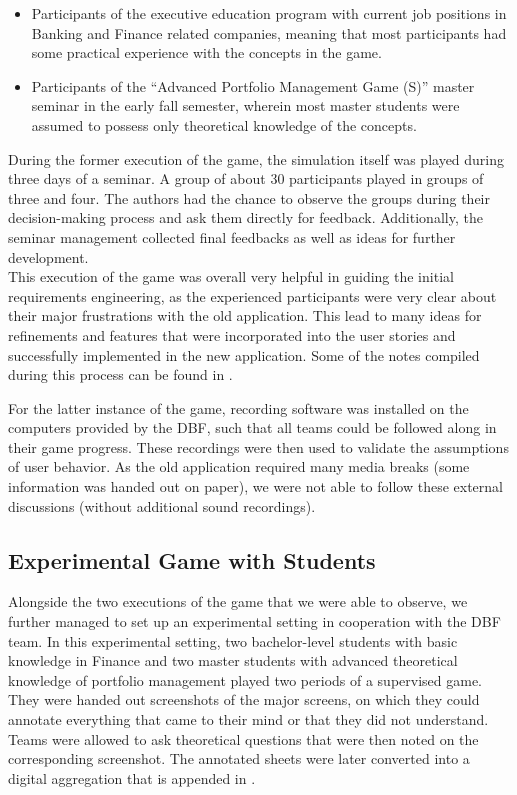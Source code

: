 \begin{itemize}
  \item Participants of the executive education program with current job positions in Banking and Finance related companies, meaning that most participants had some practical experience with the concepts in the game.
  \item Participants of the ``Advanced Portfolio Management Game (S)'' master seminar in the early fall semester, wherein most master students were assumed to possess only theoretical knowledge of the concepts.
\end{itemize}

During the former execution of the game, the simulation itself was played during three days of a seminar. A group of about 30 participants played in groups of three and four. The authors had the chance to observe the groups during their decision-making process and ask them directly for feedback. Additionally, the seminar management collected final feedbacks as well as ideas for further development.\\

This execution of the game was overall very helpful in guiding the initial requirements engineering, as the experienced participants were very clear about their major frustrations with the old application. This lead to many ideas for refinements and features that were incorporated into the user stories and successfully implemented in the new application. Some of the notes compiled during this process can be found in .

For the latter instance of the game, recording software was installed on the computers provided by the DBF, such that all teams could be followed along in their game progress. These recordings were then used to validate the assumptions of user behavior. As the old application required many media breaks (some information was handed out on paper), we were not able to follow these external discussions (without additional sound recordings).


\subsection{Experimental Game with Students}
Alongside the two executions of the game that we were able to observe, we further managed to set up an experimental setting in cooperation with the DBF team. In this experimental setting, two bachelor-level students with basic knowledge in Finance and two master students with advanced theoretical knowledge of portfolio management played two periods of a supervised game. They were handed out screenshots of the major screens, on which they could annotate everything that came to their mind or that they did not understand. Teams were allowed to ask theoretical questions that were then noted on the corresponding screenshot. The annotated sheets were later converted into a digital aggregation that is appended in . \\

